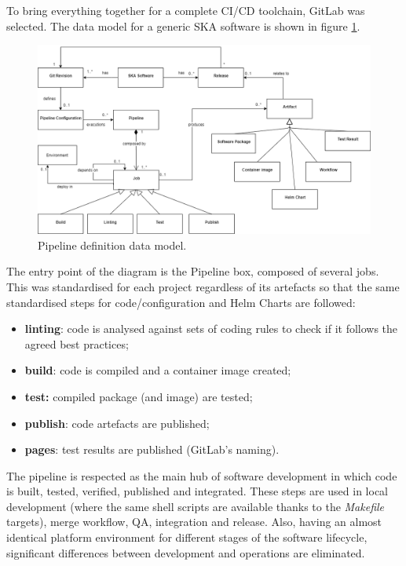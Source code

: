 \documentclass[a4paper,
	       keeplastbox,   %
	       References
	       ]{jacow}
\begin{document}
To bring everything together for a complete CI/CD toolchain, GitLab\cite{gitlab} was selected. The data model for a generic SKA software is shown in figure \ref{fig:pipelinedatamodel}.

\begin{figure}[!htb]
   \centering
   \includegraphics*[width=0.8\columnwidth]{dataEntity}
   \caption{Pipeline definition data model.}
   \label{fig:pipelinedatamodel}
\end{figure}

The entry point of the diagram is the Pipeline box, composed of several jobs. This was standardised for each project regardless of its artefacts so that the same standardised steps for code/configuration and Helm Charts are followed:

\begin{itemize}
	\setlength\itemsep{0.1em}
    \item \textbf{linting}: code is analysed against sets of coding rules to check if it follows the agreed best practices;
    \item \textbf{build}: code is compiled and a container image created;
    \item \textbf{test:} compiled package (and image) are tested;
    \item \textbf{publish}: code artefacts are published;
    \item \textbf{pages}: test results are published (GitLab's naming).
\end{itemize}

The pipeline is respected as the main hub of software development in which code is built, tested, verified, published and integrated. These steps are used in local development (where the same shell scripts are available thanks to the \textit{Makefile} targets), merge workflow, QA, integration and release. Also, having an almost identical platform environment for different stages of the software lifecycle, significant differences between development and operations are eliminated.
\end{document}
